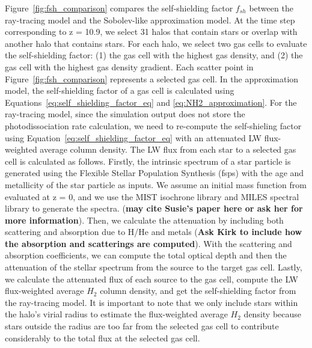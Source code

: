 \documentclass[linenumbers, twocolumn]{aastex631}
\begin{document}
Figure~\ref{fig:fsh_comparison} compares the self-shielding factor $f_{sh}$ between the ray-tracing model and the Sobolev-like approximation model. At the time step corresponding to z = 10.9, we select 31 halos that contain stars or overlap with another halo that contains stars. For each halo, we select two gas cells to evaluate the self-shielding factor: (1) the gas cell with the highest gas density, and (2) the gas cell with the highest gas density gradient. Each scatter point in Figure~\ref{fig:fsh_comparison} represents a selected gas cell. In the approximation model, the self-shielding factor of a gas cell is calculated using Equations~\ref{eq:self_shielding_factor_eq} and \ref{eq:NH2_approximation}. For the ray-tracing model, since the simulation output does not store the photodissociation rate calculation, we need to re-compute the self-shieling factor using Equation~\ref{eq:self_shielding_factor_eq} with an attenuated LW flux-weighted average column density. The LW flux from each star to a selected gas cell is calculated as follows. Firstly, the intrinsic spectrum of a star particle is generated using the Flexible Stellar Population Synthesis (fsps) with the age and metallicity of the star particle as inputs. We assume an initial mass function from \cite{Dave+2008} evaluated at z = 0, and we use the MIST isochrone library and MILES spectral library to generate the spectra. (\textbf{may cite Susie's paper here or ask her for more information}). Then, we calculate the attenuation by including both scattering and absorption due to H/He and metals (\textbf{Ask Kirk to include how the absorption and scatterings are computed}). With the scattering and absorption coefficients, we can compute the total optical depth and then the attenuation of the stellar spectrum from the source to the target gas cell. Lastly, we calculate the attenuated flux of each source to the gas cell, compute the LW flux-weighted average $H_{2}$ column density, and get the self-shielding factor from the ray-tracing model. It is important to note that we only include stars within the halo's virial radius to estimate the flux-weighted average $H_{2}$ density because stars outside the radius are too far from the selected gas cell to contribute considerably to the total flux at the selected gas cell. 
\end{document}
